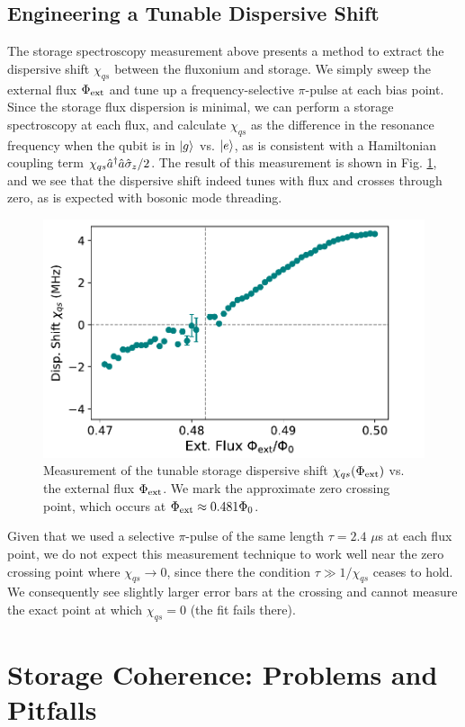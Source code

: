 \subsection{Engineering a Tunable Dispersive Shift}

The storage spectroscopy measurement above presents a method to extract the dispersive shift $\chi_{qs}$ between the fluxonium and storage. We simply sweep the external flux $\Phi_{\rm ext}$ and tune up a frequency-selective $\pi$-pulse at each bias point. Since the storage flux dispersion is minimal, we can perform a storage spectroscopy at each flux, and calculate $\chi_{qs}$ as the difference in the resonance frequency when the qubit is in $\lvert g\rangle$ vs. $\lvert e\rangle$, as is consistent with a Hamiltonian coupling term $\chi_{qs} \hat{a}^\dagger\hat{a}\hat{\sigma}_z/2$. The result of this measurement is shown in Fig. \ref{fig:4_tunable_chi}, and we see that the dispersive shift indeed tunes with flux and crosses through zero, as is expected with bosonic mode threading. 

\begin{figure}[h]
    \centering
    \includegraphics[width=0.6\linewidth]{Figures/4/tunable_chi.pdf}
    \caption{Measurement of the tunable storage dispersive shift $\chi_{qs}(\Phi_{\rm ext})$ vs. the external flux $\Phi_{\rm ext}$. We mark the approximate zero crossing point, which occurs at $\Phi_{\rm ext} \approx 0.481\Phi_0$.}
    \label{fig:4_tunable_chi}
\end{figure}

Given that we used a selective $\pi$-pulse of the same length $\tau = 2.4$ $\mu$s at each flux point, we do not expect this measurement technique to work well near the zero crossing point where $\chi_{qs} \to 0$, since there the condition $\tau \gg 1/\chi_{qs}$ ceases to hold. We consequently see slightly larger error bars at the crossing and cannot measure the exact point at which $\chi_{qs}=0$ (the fit fails there). 

\clearpage

\section{Storage Coherence: Problems and Pitfalls \label{sec:4_StorageCoherenceProblems}}

